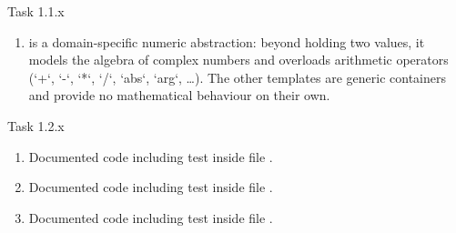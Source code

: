 \begin{problem}{}{Task 1.1.x}
\begin{enumerate}[(1)]
        \item  
             is a domain-specific numeric
            abstraction: beyond holding two values, it models the algebra
            of complex numbers and overloads arithmetic operators
            (`+`, `-`, `*`, `/`, `abs`, `arg`, …).
            The other templates are generic containers and provide no
            mathematical behaviour on their own.
    \end{enumerate}
\end{problem}

\begin{problem}{}{Task 1.2.x}
    \begin{enumerate}[(1)]
        \item Documented code including test inside file .
        \item Documented code including test inside file .
        \item Documented code including test inside file .
    \end{enumerate}
\end{problem}

